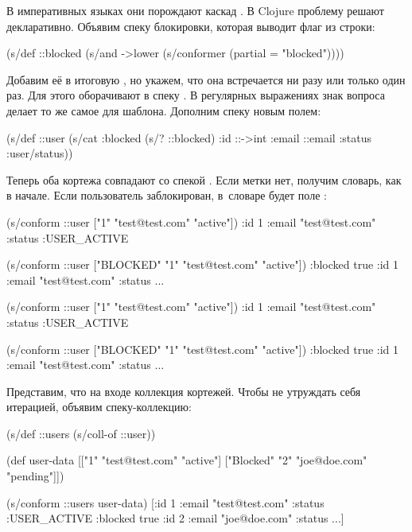 В императивных языках они порождают каскад . В Clojure проблему
решают декларативно. Объявим спеку блокировки, которая выводит флаг из строки:

\begin{clojure}
(s/def ::blocked
  (s/and
   ->lower
   (s/conformer (partial = "blocked"))))
\end{clojure}


Добавим её в итоговую , но укажем, что она встречается ни разу или
только один раз. Для этого  оборачивают в спеку .  В
регулярных выражениях знак вопроса делает то же самое для шаблона. Дополним
спеку новым полем:

\begin{clojure}
(s/def ::user
  (s/cat :blocked (s/? ::blocked)
         :id ::->int
         :email ::email
         :status :user/status))
\end{clojure}

Теперь оба кортежа совпадают со спекой . Если метки нет, получим
словарь, как в начале. Если пользователь заблокирован, в~словаре будет поле
:

\ifnarrow

\begin{clojure}
(s/conform ::user
  ["1" "test@test.com" "active"])
{:id 1
 :email "test@test.com"
 :status :USER_ACTIVE}

(s/conform ::user
  ["BLOCKED" "1"
   "test@test.com" "active"])
{:blocked true
 :id 1
 :email "test@test.com"
 :status ...}
\end{clojure}

\else

\begin{clojure}
(s/conform ::user ["1" "test@test.com" "active"])
{:id 1 :email "test@test.com" :status :USER_ACTIVE}

(s/conform ::user ["BLOCKED" "1" "test@test.com" "active"])
{:blocked true :id 1 :email "test@test.com" :status ...}
\end{clojure}

\fi

Представим, что на входе коллекция кортежей. Чтобы не утруждать себя итерацией,
объявим спеку-коллекцию:

\ifnarrow

\begin{clojure}
(s/def ::users (s/coll-of ::user))

(def user-data
  [["1" "test@test.com" "active"]
   ["Blocked" "2" "joe@doe.com"
    "pending"]])

(s/conform ::users user-data)
[{:id 1
  :email "test@test.com"
  :status :USER_ACTIVE}
 {:blocked true
  :id 2
  :email "joe@doe.com"
  :status ...}]
\end{clojure}

